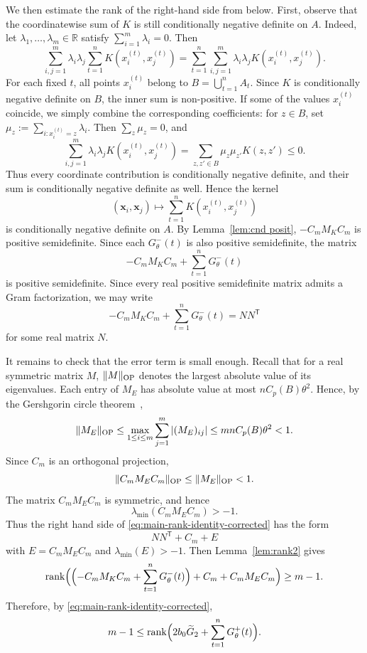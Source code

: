 \documentclass[11pt]{article}
\theoremstyle{definition}
\begin{document}
We then estimate the rank of the right-hand side from below. First, observe that the coordinatewise sum of \(K\) is still conditionally negative definite on \(A\). Indeed, let \(\lambda_1,\dots,\lambda_m\in\mathbb R\) satisfy \(\sum_{i=1}^m\lambda_i=0\). Then \[ \sum_{i,j=1}^m \lambda_i\lambda_j \sum_{t=1}^n K(x_i^{(t)},x_j^{(t)}) = \sum_{t=1}^n \sum_{i,j=1}^m \lambda_i\lambda_j K(x_i^{(t)},x_j^{(t)}). \] For each fixed \(t\), all points \(x_i^{(t)}\) belong to \(B=\bigcup_{t=1}^n A_t\). Since \(K\) is conditionally negative definite on \(B\), the inner sum is non-positive. If some of the values \(x_i^{(t)}\) coincide, we simply combine the corresponding coefficients: for \(z\in B\), set \( \mu_z:=\sum_{i:x_i^{(t)}=z}\lambda_i. \) Then \(\sum_z\mu_z=0\), and \[ \sum_{i,j=1}^m \lambda_i\lambda_j K(x_i^{(t)},x_j^{(t)}) = \sum_{z,z'\in B}\mu_z\mu_{z'}K(z,z')\le0. \] Thus every coordinate contribution is conditionally negative definite, and their sum is conditionally negative definite as well. Hence the kernel \[ (\boldsymbol{x}_i,\boldsymbol{x}_j)\mapsto \sum_{t=1}^nK(x_i^{(t)},x_j^{(t)}) \] is conditionally negative definite on \(A\). By Lemma~\ref{lem:cnd posit}, \(-C_mM_KC_m\) is positive semidefinite. Since each \(G_\theta^-(t)\) is also positive semidefinite, the matrix
\[
-C_mM_KC_m+\sum_{t=1}^nG_\theta^-(t)
\]
is positive semidefinite. Since every real positive semidefinite matrix admits a Gram factorization, we may write 
\[ -C_mM_KC_m+\sum_{t=1}^nG_\theta^-(t)=NN^{\mathsf T} \]
for some real matrix \(N\).

It remains to check that the error term is small enough.
Recall that for a real symmetric matrix \(M\), \(\|M\|_{\textup{OP}}\) denotes the largest
absolute value of its eigenvalues.  Each entry of \(M_E\) has absolute value at
most \(nC_p(B)\theta^2\).  Hence, by the Gershgorin circle theorem~\cite{1931Ger},
\[
\|M_E\|_\textup{OP}
\le
\max_{1\le i\le m}\sum_{j=1}^m |(M_E)_{ij}|
\le mnC_p(B)\theta^2<1.
\]
Since \(C_m\) is an orthogonal projection,
\[
\|C_mM_EC_m\|_\textup{OP}\le \|M_E\|_\textup{OP}<1.
\]
The matrix \(C_mM_EC_m\) is symmetric, and hence
\[
\lambda_{\min}(C_mM_EC_m)>-1.
\]
Thus the right hand side of \eqref{eq:main-rank-identity-corrected} has the form
\[
NN^{\mathsf T}+C_m+E
\]
with \(E=C_mM_EC_m\) and \(\lambda_{\min}(E)>-1\).  Then Lemma~\ref{lem:rank2} gives
\[
\operatorname{rank}\Bigl(
\Bigl(-C_mM_KC_m+\sum_{t=1}^nG_\theta^-(t)\Bigr)+C_m+C_mM_EC_m
\Bigr)\ge m-1.
\]
Therefore, by \eqref{eq:main-rank-identity-corrected},
\[
m-1
\le
\operatorname{rank}\Bigl(2b_0\widetilde G_2+\sum_{t=1}^nG_\theta^+(t)\Bigr).
\]
\end{document}
